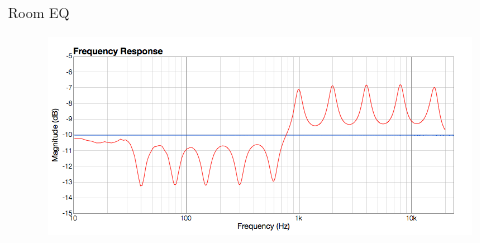 \documentclass{beamer}
\begin{document}
\begin{frame}[t]{Room EQ}
\begin{figure}[b]
\includegraphics[height=0.32\textwidth]{figure/roomeq.png}
\end{figure}

\end{frame}
\end{document}
